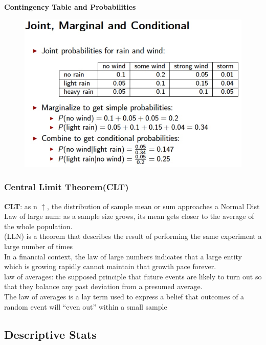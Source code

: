 \documentclass{beamer}
\begin{document}
\begin{frame}\textbf{Contingency Table and Probabilities}
\begin{figure}
\includegraphics[scale=0.5]{JointMarginalConditional} 
\end{figure}
\end{frame}



\begin{frame}\frametitle{Central Limit Theorem(CLT)}
\textbf{CLT}: as n $\uparrow$, the distribution of sample mean or sum approaches a Normal Dist\\
Law of large num: as a sample size grows, its mean gets closer to the average of the whole population.\\
(LLN) is a theorem that describes the result of performing the same experiment a large number of times\\
In a financial context, the law of large numbers indicates that a large entity which is growing rapidly cannot maintain that growth pace forever.\\
law of averages: the supposed principle that future events are likely to turn out so that they balance any past deviation from a presumed average.\\
The law of averages is a lay term used to express a belief that outcomes of a random event will “even out” within a small sample
\end{frame}



\subsection{Descriptive Stats}
\end{document}
